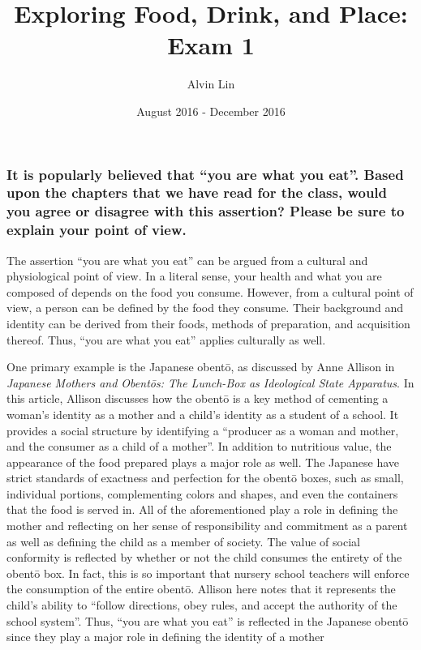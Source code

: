 \documentclass[letterpaper, 12pt]{article}
\title{Exploring Food, Drink, and Place: Exam 1}
\author{Alvin Lin}
\date{August 2016 - December 2016}
\begin{document}
\maketitle

\subsubsection*{It is popularly believed that ``you are what you eat''. Based
upon the chapters that we have read for the class, would you agree or disagree
with this assertion? Please be sure to explain your point of view.}

The assertion ``you are what you eat'' can be argued from a cultural and
physiological point of view. In a literal sense, your health and what you are
composed of depends on the food you consume. However, from a cultural point of
view, a person can be defined by the food they consume. Their background
and identity can be derived from their foods, methods of preparation, and
acquisition thereof. Thus, ``you are what you eat'' applies culturally as
well. \par
One primary example is the Japanese obent\={o}, as discussed by Anne Allison in
\textit{Japanese Mothers and Obent\={o}s: The Lunch-Box as Ideological State
Apparatus}. In this article, Allison discusses how the obent\={o} is a key
method of cementing a woman's identity as a mother and a child's identity as
a student of a school. It provides a social structure by identifying a
``producer as a woman and mother, and the consumer as a child of a mother''. In
addition to nutritious value, the appearance of the food prepared plays a major
role as well. The Japanese have strict standards of exactness and perfection
for the obent\={o} boxes, such as small, individual portions, complementing
colors and shapes, and even the containers that the food is served in. All of
the aforementioned play a role in defining the mother and reflecting on her
sense of responsibility and commitment as a parent as well as defining the
child as a member of society. The value of social conformity is reflected by
whether or not the child consumes the entirety of the obent\={o} box. In fact,
this is so important that nursery school teachers will enforce the consumption
of the entire obent\={o}. Allison here notes that it represents the child's
ability to ``follow directions, obey rules, and accept the authority of the
school system''. Thus, ``you are what you eat'' is reflected in the Japanese
obent\={o} since they play a major role in defining the identity of a mother
\end{document}
